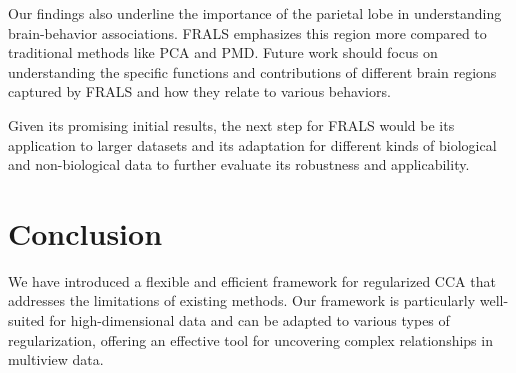 Our findings also underline the importance of the parietal lobe in understanding brain-behavior associations.
FRALS emphasizes this region more compared to traditional methods like PCA and PMD. Future work should focus on understanding the specific functions and contributions of different brain regions captured by FRALS and how they relate to various behaviors.

Given its promising initial results, the next step for FRALS would be its application to larger datasets and its adaptation for different kinds of biological and non-biological data to further evaluate its robustness and applicability.



\section{Conclusion}

We have introduced a flexible and efficient framework for regularized CCA that addresses the limitations of existing methods.
Our framework is particularly well-suited for high-dimensional data and can be adapted to various types of regularization, offering an effective tool for uncovering complex relationships in multiview data.







